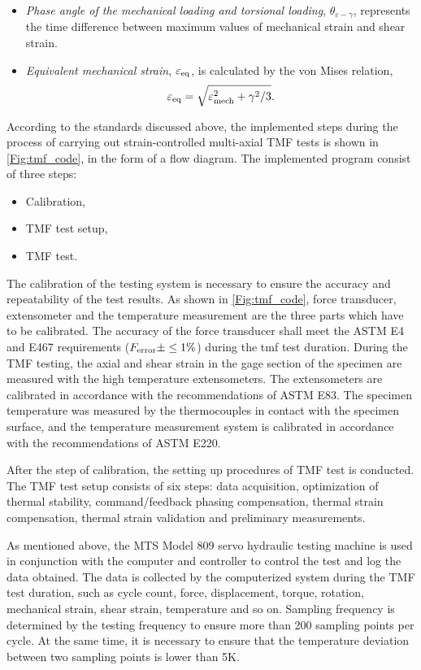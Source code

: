 \begin{itemize}
  \item {\em Phase angle of the mechanical loading and torsional loading}, $\theta_{\varepsilon-\gamma}$, represents the time difference between maximum values of mechanical strain and shear strain.
  \item {\em Equivalent mechanical strain}, $\varepsilon_{\rm{eq}}$, is calculated by the von Mises relation\cite{Pol1991Cyclic},
  \begin{equation}
  \varepsilon_{\rm{eq}}=\sqrt {\varepsilon_{\rm{mech}}^2 + {\gamma ^2}/3}.
  \end{equation}
\end{itemize}

According to the standards discussed above, the implemented steps during the process of carrying out strain-controlled multi-axial TMF tests is shown in \ref{Fig:tmf_code}, in the form of a flow diagram.
The implemented program consist of three steps:
\begin{itemize}
  \item Calibration,
  \item TMF test setup,
  \item TMF test.
\end{itemize}

The calibration of the testing system is necessary to ensure the accuracy and repeatability of the test results.
As shown in \ref{Fig:tmf_code}, force transducer, extensometer and the temperature measurement are the three parts which have to be calibrated.
The accuracy of the force transducer shall meet the ASTM E4 and E467 requirements ($F_{\rm error}\pm \leq 1\%$) during the tmf test duration.
During the TMF testing, the axial and shear strain in the gage section of the specimen are measured with the high temperature extensometers.
The extensometers are calibrated in accordance with the recommendations of ASTM E83.
The specimen temperature was measured by the thermocouples in contact with the specimen surface, and the temperature measurement system is calibrated in accordance with the recommendations of ASTM E220.

After the step of calibration, the setting up procedures of TMF test is conducted.
The TMF test setup consists of six steps: data acquisition, optimization of thermal stability, command/feedback phasing compensation, thermal strain compensation, thermal strain validation and preliminary measurements.

As mentioned above, the MTS Model 809 servo hydraulic testing machine is used in conjunction with the computer and controller to control the test and log the data obtained.
The data is collected by the computerized system during the TMF test duration, such as cycle count, force, displacement, torque, rotation, mechanical strain, shear strain, temperature and so on. Sampling frequency is determined by the testing frequency to ensure more than 200 sampling points per cycle. At the same time, it is necessary to ensure that the temperature deviation between two sampling points is lower than 5K.

